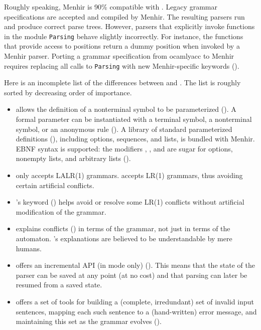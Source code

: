 \documentclass[onecolumn,11pt,nocopyrightspace,preprint]{sigplanconf}
\begin{document}
Roughly speaking, Menhir is 90\% compatible with \ocamlyacc. Legacy \ocamlyacc
grammar specifications are accepted and compiled by Menhir. The resulting
parsers run and produce correct parse trees. However, parsers that explicitly
invoke functions in the module \texttt{Parsing} behave slightly incorrectly.
For instance, the functions that provide access to positions return a dummy
position when invoked by a Menhir parser. Porting a grammar specification from
ocamlyacc to Menhir requires replacing all calls to \texttt{Parsing} with new
Menhir-specific keywords ().

Here is an incomplete list of the differences between \ocamlyacc and \menhir.
The list is roughly sorted by decreasing order of importance.

\begin{itemize}

\item \menhir allows the definition of a nonterminal symbol to be
  parameterized (). A formal parameter can be instantiated
  with a terminal symbol, a nonterminal symbol, or an anonymous rule
  (). A library of standard parameterized definitions
  (), including options, sequences, and lists, is bundled
  with Menhir. EBNF syntax is supported: the modifiers \dquestion, \dplus, and
  \dstar are sugar for options, nonempty lists, and arbitrary lists
  ().

\item \ocamlyacc only accepts LALR(1) grammars. \menhir accepts LR(1) grammars,
      thus avoiding certain artificial conflicts.

\item \menhir's \dinline keyword () helps avoid or resolve some LR(1)
      conflicts without artificial modification of the grammar.

\item \menhir explains conflicts () in terms of the grammar,
      not just in terms of the automaton. \menhir's explanations are believed
      to be understandable by mere humans.

\item \menhir offers an incremental API (in \otable mode only) (). This
          means that the state of the parser can be saved at any point (at no
          cost) and that parsing can later be resumed from a saved state.

\item \menhir offers a set of tools for building a (complete, irredundant)
  set of invalid input sentences, mapping each such sentence to a (hand-written)
  error message, and maintaining this set as the grammar evolves ().


\end{itemize}
\end{document}
